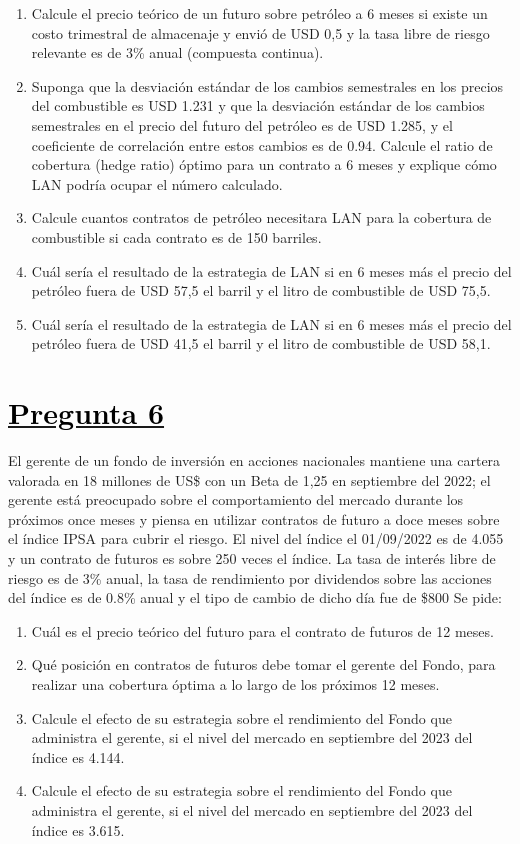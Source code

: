 \documentclass[12pt]{article}
\newcommand{\subrayadoRojo}[1]{{\color{rojoudp}\underline{\textcolor{black}{#1}}}}
\begin{document}
    \begin{enumerate}[label=\textbf{\alph*)}]
        \item Calcule el precio teórico de un futuro sobre petróleo a 6 meses si existe un costo trimestral de almacenaje y 
        envió de USD 0,5 y la tasa libre de riesgo relevante es de 3\% anual (compuesta continua).
        \item Suponga que la desviación estándar de los cambios semestrales en los precios del combustible es USD 1.231 y 
        que la desviación estándar de los cambios semestrales en el precio del futuro del petróleo es de USD 1.285, y el coeficiente 
        de correlación entre estos cambios es de 0.94. Calcule el ratio de cobertura (hedge ratio) óptimo para un contrato a 6 meses 
        y explique cómo LAN podría ocupar el número calculado.
        \item Calcule cuantos contratos de petróleo necesitara LAN para la cobertura de combustible si cada contrato es de 150 barriles.
        \item Cuál sería el resultado de la estrategia de LAN si en 6 meses más el precio del petróleo fuera de USD 57,5 el barril y el litro de combustible de USD 75,5.
        \item Cuál sería el resultado de la estrategia de LAN si en 6 meses más el precio del petróleo fuera de USD 41,5 el barril y el litro de combustible de USD 58,1.
\end{enumerate}

\vspace{1em}
\section*{\subrayadoRojo{Pregunta 6}}
El gerente de un fondo de inversión en acciones nacionales mantiene una cartera valorada en 18 millones de US\$ con un Beta de 
1,25 en septiembre del 2022; el gerente está preocupado sobre el comportamiento del mercado durante los próximos once meses y 
piensa en utilizar contratos de futuro a doce meses sobre el índice IPSA para cubrir el riesgo. El nivel del índice el 01/09/2022 
es de 4.055 y un contrato de futuros es sobre 250 veces el índice. La tasa de interés libre de riesgo es de 3\% anual, la tasa de 
rendimiento por dividendos sobre las acciones del índice es de 0.8\% anual y el tipo de cambio de dicho día fue de \$800  Se pide:
\begin{enumerate}[label=\textbf{\alph*)}]
    \item Cuál es el precio teórico del futuro para el contrato de futuros de 12 meses.
    \item Qué posición en contratos de futuros debe tomar el gerente del Fondo, para realizar una cobertura óptima a lo largo de los próximos 12 meses.
    \item Calcule el efecto de su estrategia sobre el rendimiento del Fondo que administra el gerente, si el nivel del mercado en septiembre del 2023 del índice es 4.144.
    \item Calcule el efecto de su estrategia sobre el rendimiento del Fondo que administra el gerente, si el nivel del mercado en septiembre del 2023 del índice es 3.615.

\end{enumerate}
    
\end{document}
